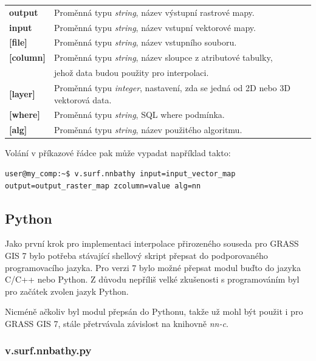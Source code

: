 \documentclass[12pt,a4paper]{article}
\begin{document}
\bigskip
\begin{tabular}{ll}
\textbf{output}& Proměnná typu \emph{string}, název výstupní rastrové mapy.\\
\textbf{input}& Proměnná typu \emph{string}, název vstupní vektorové mapy.\\
\textbf{[file]}& Proměnná typu \emph{string}, název vstupního souboru.\\
\textbf{[column]}& Proměnná typu \emph{string}, název sloupce z atributové tabulky,\\
\textbf{}& jehož data budou použity pro interpolaci.\\
\textbf{[layer]}& Proměnná typu \emph{integer}, nastavení, zda se jedná od 2D nebo 3D vektorová data.\\
\textbf{[where]}& Proměnná typu \emph{string}, SQL where podmínka.\\
\textbf{[alg]}& Proměnná typu \emph{string}, název použitého algoritmu.\\
\end{tabular}

\newpage
Volání v příkazové řádce pak může vypadat například takto:
\begin{lstlisting}[caption={bash version}]
user@my_comp:~$ v.surf.nnbathy input=input_vector_map output=output_raster_map zcolumn=value alg=nn
\end{lstlisting}

\subsection{Python}
\label{sec:python}

Jako první krok pro implementaci interpolace přirozeného souseda pro
GRASS GIS 7 bylo potřeba stávající shellový skript přepsat do
podporovaného programovacího jazyka. Pro verzi 7 bylo možné přepsat
modul buďto do jazyka C/C++ nebo Python. Z důvodu nepříliš velké
zkušenosti s programováním byl pro začátek zvolen jazyk Python.

Nicméně ačkoliv byl modul přepsán do Pythonu, takže už mohl být 
použit i pro GRASS GIS 7, stále přetrvávala závislost na knihovně \emph{nn-c}.

\subsubsection{v.surf.nnbathy.py}
\end{document}
